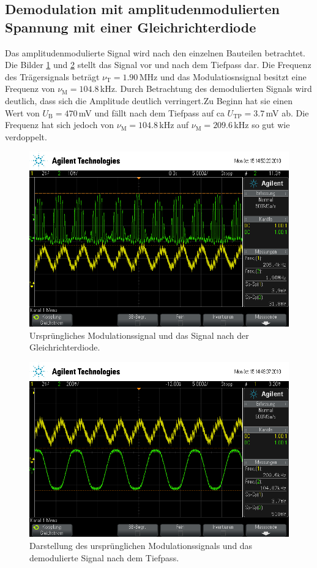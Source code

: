 \subsection{Demodulation mit amplitudenmodulierten Spannung mit einer
Gleichrichterdiode}
Das amplitudenmodulierte Signal wird nach den einzelnen Bauteilen betrachtet.
Die Bilder \ref{vortp} und \ref{ntp} stellt das Signal vor und nach dem Tiefpass dar.
Die Frequenz des Trägersignals beträgt $\nu_\text{T}=1.90\,$MHz und das Modulatiosnsignal
besitzt eine Frequenz von $\nu_\text{M}=104.8\,$kHz.
Durch Betrachtung des demodulierten Signals wird deutlich, dass sich die
Amplitude deutlich verringert.Zu Beginn hat sie einen Wert von $U_\text{B}=470\,$mV
und fällt nach dem Tiefpass auf ca $U_\text{TP}=3.7\,$mV ab. Die Frequenz hat
sich jedoch von $\nu_\text{M}=104.8\,$kHz auf $\nu_\text{M}=209.6\,$kHz so gut wie
verdoppelt.
\begin{figure}
  \centering
  \includegraphics[width=0.7\linewidth]{ressources/scope_461.png}
  \caption{Ursprüngliches Modulationssignal und das Signal nach der Gleichrichterdiode.}
  \label{vortp}
\end{figure}

\begin{figure}
  \centering
  \includegraphics[width=0.7\linewidth]{ressources/scope_460.png}
  \caption{Darstellung des ursprünglichen Modulationssignals und das demodulierte Signal nach dem Tiefpass.}
  \label{ntp}
\end{figure}
